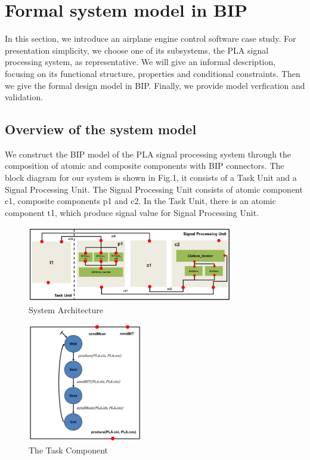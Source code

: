 
\section{Formal system model in BIP}

In this section, we introduce an airplane engine control software case study. 
 For presentation simplicity, we choose one of its subsystems, the PLA signal processing system, as representative. 
 We will give an informal description, focusing on its functional structure, properties and conditional constraints. 
 Then we give the formal design model in BIP. 
 Finally, we provide model verfication and validation.


\subsection{Overview of the system model}

We construct the BIP model of the PLA signal processing system through the composition of atomic and composite components with BIP connectors. 
 The block diagram for our system is shown in Fig.1, it consists of a Task Unit and a Signal Processing Unit. 
 The Signal Processing Unit consists of atomic component c1, composite components p1 and c2. 
 In the Task Unit, there is an atomic component t1, which produce signal value for Signal Processing Unit.

\begin{figure}[ht!]
	\centering
	\includegraphics[width=90mm]{figure/figure2.jpg}
	\caption{System Architecture}
	\label{Sys_Model}
\end{figure}

\begin{figure}[ht!]
	\centering
	\includegraphics[width=50mm]{figure/figure3.jpg}
	\caption{The Task Component}
	\label{Task_Component}
\end{figure}

